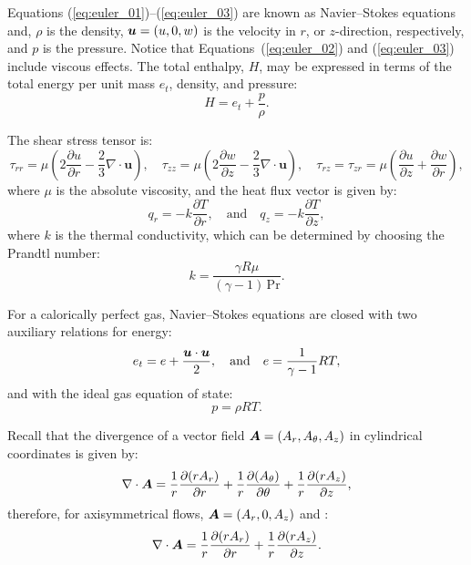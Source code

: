 \documentclass[10pt]{article}
\newcommand{\bv}[1]{\ensuremath{\mbox{\boldmath$ #1 $}}}
\newcommand{\Diff}[2] {\dfrac{\partial( #1)}{\partial #2}}
\newcommand{\diff}[2] {\dfrac{\partial #1}{\partial #2}}
\begin{document}
Equations (\ref{eq:euler_01})--(\ref{eq:euler_03}) are known as Navier--Stokes equations and, $\rho$ is the density, $\bv{u}=(u,0,w)$ is the velocity in $r$, or $z$-direction, respectively,    and $p$ is the pressure. Notice that Equations~(\ref{eq:euler_02}) and (\ref{eq:euler_03}) include viscous effects. The total enthalpy, $H$, may be expressed in terms of the total energy per unit mass $e_t$, density, and pressure:
$$H = e_t + \dfrac{p}{\rho}.$$


The shear stress tensor is:
\begin{equation}
\tau_{rr}=  \mu \left( 2 \diff{u}{r} - \dfrac{2}{3} \nabla \cdot  \mathbf{u} \right),
\quad  \tau_{zz}=  \mu \left( 2 \diff{w}{z} - \dfrac{2}{3} \nabla \cdot \mathbf{u} \right),
\quad\tau_{rz}= \tau_{zr}=\mu \left( \diff{u}{z} + \diff{w}{r}\right),
\end{equation}
where $\mu$ is the absolute viscosity, and the heat flux vector is given by:
\begin{equation}
 q_r = - k \diff{T}{r},  \quad \mbox{and} \quad q_z = - k \diff{T}{z},
 \end{equation}
where $k$ is the thermal conductivity, which can be determined by choosing the Prandtl number:
$$k= \dfrac{\gamma R \mu}{ (\gamma-1) \, \mbox{Pr} }.$$

For a calorically perfect gas, Navier--Stokes equations are closed with two auxiliary relations for energy:
\begin{equation}
 \label{eq:euler_04}
e_t= e+\dfrac{\bv{u}\cdot \bv{u}}{2},\quad\mbox{and}\quad e=\dfrac{1}{\gamma -1}RT ,
\end{equation}
and with the ideal gas equation of state:
\begin{equation}
 \label{eq:euler_05}
p=\rho RT.
\end{equation}


Recall that the  divergence of a vector field $\bv{A}=(A_r,A_\theta,A_z)$ in cylindrical coordinates is given by:
\begin{equation*}
 \nabla\cdot \bv{A}= \dfrac{1}{r}\Diff{r A_r}{r} +\dfrac{1}{r}\Diff{ A_\theta}{\theta} +\dfrac{1}{r}\Diff{r A_z}{z},
\end{equation*}
therefore, for axisymmetrical flows,  $\bv{A}=(A_r,0,A_z)$  and :
\begin{equation*}
 \nabla\cdot \bv{A}= \dfrac{1}{r}\Diff{r A_r}{r}  +\dfrac{1}{r}\Diff{r A_z}{z}.
\end{equation*}
\end{document}
